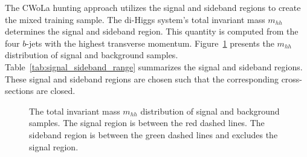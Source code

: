 \documentclass[12pt]{article}
\begin{document}
        The CWoLa hunting approach utilizes the signal and sideband regions to create the mixed training sample. The di-Higgs system's total invariant mass $m_{hh}$ determines the signal and sideband region. This quantity is computed from the four $b$-jets with the highest transverse momentum. Figure~\ref{fig:mhh_distribution} presents the $m_{hh}$ distribution of signal and background samples. Table~\ref{tab:signal_sideband_range} summarizes the signal and sideband regions. These signal and sideband regions are chosen such that the corresponding cross-sections are closed.
        \begin{figure}[htpb]
            \centering
            \caption{The total invariant mass $m_{hh}$ distribution of signal and background samples. The signal region is between the red dashed lines. The sideband region is between the green dashed lines and excludes the signal region.}
            \label{fig:mhh_distribution}
        \end{figure}
\end{document}
